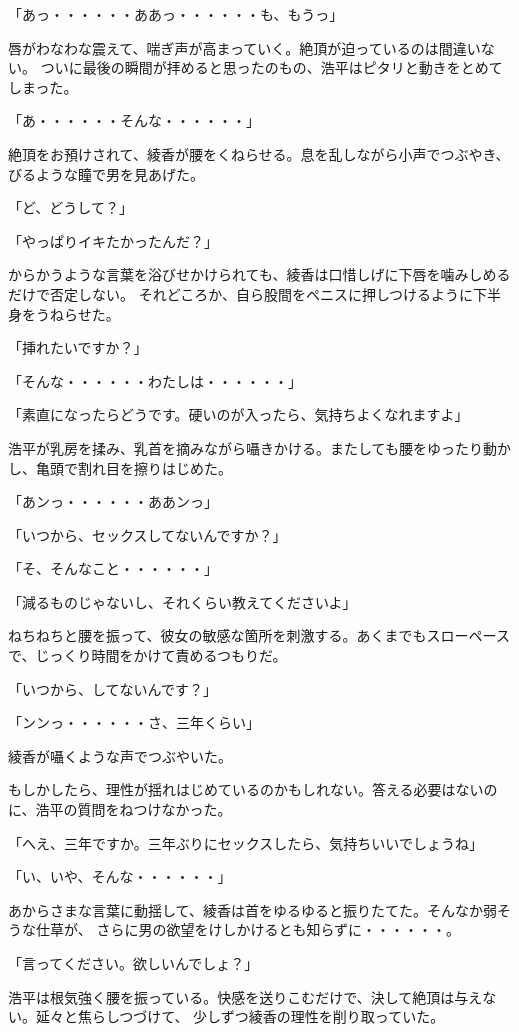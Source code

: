 ﻿\documentclass[book,tate]{jlreq}
\begin{document}
「あっ・・・・・・ああっ・・・・・・も、もうっ」

唇がわなわな震えて、喘ぎ声が高まっていく。絶頂が迫っているのは間違いない。
ついに最後の瞬間が拝めると思ったのもの、浩平はピタリと動きをとめてしまった。

「あ・・・・・・そんな・・・・・・」

絶頂をお預けされて、綾香が腰をくねらせる。息を乱しながら小声でつぶやき、びるような瞳で男を見あげた。

「ど、どうして？」

「やっぱりイキたかったんだ？」

からかうような言葉を浴びせかけられても、綾香は口惜しげに下唇を噛みしめるだけで否定しない。
それどころか、自ら股間をペニスに押しつけるように下半身をうねらせた。

「挿れたいですか？」

「そんな・・・・・・わたしは・・・・・・」

「素直になったらどうです。硬いのが入ったら、気持ちよくなれますよ」

浩平が乳房を揉み、乳首を摘みながら囁きかける。またしても腰をゆったり動かし、亀頭で割れ目を擦りはじめた。

「あンっ・・・・・・ああンっ」

「いつから、セックスしてないんですか？」

「そ、そんなこと・・・・・・」

「減るものじゃないし、それくらい教えてくださいよ」

ねちねちと腰を振って、彼女の敏感な箇所を刺激する。あくまでもスローペースで、じっくり時間をかけて責めるつもりだ。

「いつから、してないんです？」

「ンンっ・・・・・・さ、三年くらい」

綾香が囁くような声でつぶやいた。

もしかしたら、理性が揺れはじめているのかもしれない。答える必要はないのに、浩平の質問をねつけなかった。

「へえ、三年ですか。三年ぶりにセックスしたら、気持ちいいでしょうね」

「い、いや、そんな・・・・・・」

あからさまな言葉に動揺して、綾香は首をゆるゆると振りたてた。そんなか弱そうな仕草が、
さらに男の欲望をけしかけるとも知らずに・・・・・・。

「言ってください。欲しいんでしょ？」

浩平は根気強く腰を振っている。快感を送りこむだけで、決して絶頂は与えない。延々と焦らしつづけて、
少しずつ綾香の理性を削り取っていた。
\end{document}
